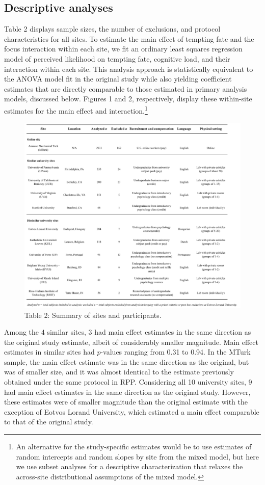 \documentclass[english,floatsintext,man]{apa6}
\theoremstyle{definition}
\theoremstyle{definition}
\theoremstyle{definition}
\theoremstyle{remark}
\begin{document}
\subsection{Descriptive analyses}\label{descriptive-analyses}

Table 2 displays sample sizes, the number of exclusions, and protocol
characteristics for all sites. To estimate the main effect of tempting
fate and the focus interaction within each site, we fit an ordinary
least squares regression model of perceived likelihood on tempting fate,
cognitive load, and their interaction within each site. This analysis
approach is statistically equivalent to the ANOVA model fit in the
original study while also yielding coefficient estimates that are
directly comparable to those estimated in primary analysis models,
discussed below. Figures 1 and 2, respectively, display these
within-site estimates for the main effect and interaction.\footnote{An
  alternative for the study-specific estimates would be to use estimates
  of random intercepts and random slopes by site from the mixed model,
  but here we use subset analyses for a descriptive characterization
  that relaxes the across-site distributional assumptions of the mixed
  model.}

\begin{figure}
\centering
\includegraphics{summary_table/table_2.pdf}
\caption{Table 2: Summary of sites and participants.}
\end{figure}

Among the 4 similar sites, 3 had main effect estimates in the same
direction as the original study estimate, albeit of considerably smaller
magnitude. Main effect estimates in similar sites had \(p\)-values
ranging from 0.31 to 0.94. In the MTurk sample, the main effect estimate
was in the same direction as the original, but was of smaller size, and
it was almost identical to the estimate previously obtained under the
same protocol in RPP. Considering all 10 university sites, 9 had main
effect estimates in the same direction as the original study. However,
these estimates were of smaller magnitude than the original estimate
with the exception of Eotvos Lorand University, which estimated a main
effect comparable to that of the original study.
\end{document}

